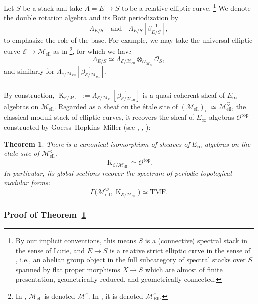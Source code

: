 \documentclass[12pt, oneside]{amsart}
\numberwithin{equation}{section}
\newtheorem{theorem}[subsubsection]{Theorem}
\theoremstyle{remark}
\theoremstyle{plain}
\newcommand{\lam}{\Lambda}
\newcommand{\OO}{\mathcal{O}}
\newcommand{\cl}{{\operatorname{cl}}}
\newcommand{\K}{\operatorname{K}}
\newcommand{\Mell}{\mathcal{M}_{\mathrm{ell}}}
\begin{document}
Let $S$ be a stack and take $A = E \to S$ to be a relative elliptic curve.%
\footnote{By our implicit conventions, this means $S$ is a (connective) spectral stack in the sense of Lurie, and $E \to S$ is a relative strict elliptic curve in the sense of \cite{LurieEll2}, i.e., an abelian group object in the full subcategory of spectral stacks over $S$ spanned by flat proper morphisms $X \to S$ which are almost of finite presentation, geometrically reduced, and geometrically connected.}
We denote the double rotation algebra and its Bott periodization by
\[
  \lam_{E/S} \quad \text{and} \quad \lam_{E/S}[\beta_{E/S}^{-1}],
\]
to emphasize the role of the base.
For example, we may take the universal elliptic curve $\mathcal{E} \to \Mell$ as in \cite[Thm.~2.0.3]{LurieEll1}\footnote{%
  In \cite{LurieEll1}, $\Mell$ is denoted $\mathcal{M}^{s}$.
  In \cite{LurieEll2}, it is denoted $\mathcal{M}_{\mathrm{Ell}}^{s}$.
}, for which we have
\[
  \lam_{E/S} \simeq \lam_{\mathcal{E}/\Mell} \otimes_{\OO_{\Mell}} \OO_S,
\]
and similarly for $\lam_{\mathcal{E}/\Mell}[\beta_{\mathcal{E}/\Mell}^{-1}]$.

\subsubsection{}

By construction, $\K_{\mathcal{E}/\Mell} := \lam_{\mathcal{E}/\Mell}[\beta_{\mathcal{E}/\Mell}^{-1}]$ is a quasi-coherent sheaf of $E_\infty$-algebras on $\Mell$.
Regarded as a sheaf on the étale site of $(\Mell)_\cl \simeq \Mell^{\heartsuit}$, the classical moduli stack of elliptic curves, it recovers the sheaf of $E_\infty$-algebras $\OO^{\mathrm{top}}$ constructed by Goerss--Hopkins--Miller (see \cite[Chap.~12]{DFHH}, \cite[\S4.2]{HopkinsICM}, \cite[Thm.~7.0.1]{LurieEll2}):

\begin{theorem}\label{thm:Otop}
  There is a canonical isomorphism of sheaves of $E_\infty$-algebras on the étale site of $\Mell^{\heartsuit}$,
  \[
    \K_{\mathcal{E}/\Mell}
    \simeq \OO^{\mathrm{top}}.
  \]
  In particular, its global sections recover the spectrum of periodic topological modular forms:
  \[
    \Gamma\bigl( \Mell^{\heartsuit}, \K_{\mathcal{E}/\Mell} \bigr)
    \simeq \mathrm{TMF}.
  \]
\end{theorem}

\subsubsection{Proof of Theorem~\ref{thm:Otop}}\label{sssec:proof of thm:Otop}
\end{document}
